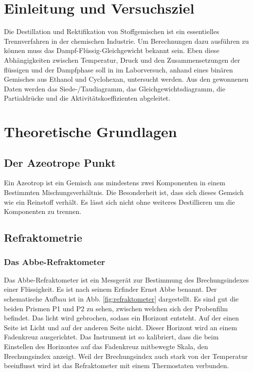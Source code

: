 \section{Einleitung und Versuchsziel}
\label{sec:aufgabenstellung}
Die Destillation und Rektifikation von Stoffgemischen ist ein essentielles Trennverfahren in der chemischen Industrie. Um Berechnungen dazu ausführen zu können muss das Dampf-Flüssig-Gleichgewicht bekannt sein. Eben diese Abhängigkeiten zwischen Temperatur, Druck und den Zusammensetzungen der flüssigen und der Dampfphase soll in im Laborversuch, anhand eines binären Gemisches aus Ethanol und Cyclohexan, untersucht werden. Aus den gewonnenen Daten werden das Siede-/Taudiagramm, das Gleichgewichtsdiagramm, die Partialdrücke und die Aktivitätskoeffizienten abgeleitet. 

\section{Theoretische Grundlagen}

\subsection{Der Azeotrope Punkt}
Ein Azeotrop ist ein Gemisch aus mindestens zwei Komponenten in einem Bestimmten Mischungsverhältnis. Die Besonderheit ist, dass sich dieses Gemsich wie ein Reinstoff verhält. Es lässt sich nicht ohne weiteres Destillieren um die Komponenten zu trennen.
\subsection{Refraktometrie}
\subsubsection*{Das Abbe-Refraktometer}
Das Abbe-Refraktometer ist ein Messgerät zur Bestimmung des Brechungsindexes einer Flüssigkeit. Es ist nach seinem Erfinder Ernst Abbe benannt. Der schematische Aufbau ist in Abb. \ref{fig:refraktometer} dargestellt. Es sind gut die beiden Prismen P1 und P2 zu sehen, zwischen welchen sich der Probenfilm befindet. Das licht wird gebrochen, sodass ein Horizont entsteht. Auf der einen Seite ist Licht und auf der anderen Seite nicht. Dieser Horizont wird an einem Fadenkreuz ausgerichtet. Das Instrument ist so kalibriert, dass die beim Einstellen des Horizontes auf das Fadenkreuz mitbewegte Skala, den Brechungsindex anzeigt. 
Weil der Brechungsindex auch stark von der Temperatur beeinflusst wird ist das Refraktometer mit einem Thermostaten verbunden.

